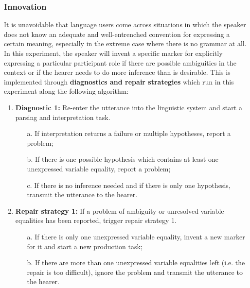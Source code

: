 \subsubsection{Innovation}
 It is unavoidable that language users come across situations in which the speaker does not know an adequate and well-entrenched convention for expressing a certain meaning, especially in the extreme case where there is no grammar at all. In this experiment, the speaker will invent a specific marker for explicitly expressing a particular participant role if there are possible ambiguities in the context or if the hearer needs to do more inference than is desirable. This is implemented through {\bfseries diagnostics and repair strategies} which run in this experiment along the following algorithm:

\begin{enumerate}
\item {\bfseries Diagnostic 1:} Re-enter the utterance into the linguistic system and start a parsing and interpretation task.
\begin{enumerate}
\item[a.] If interpretation returns a failure or multiple hypotheses, report a problem;
\item[b.] If there is one possible hypothesis which contains at least one unexpressed variable equality, report a problem;
\item[c.] If there is no inference needed and if there is only one hypothesis, transmit the utterance to the hearer.
\end{enumerate}
\item {\bfseries Repair strategy 1:} If a problem of ambiguity or unresolved variable equalities has been reported, trigger repair strategy 1.
\begin{enumerate}
\item[a.] If there is only one unexpressed variable equality, invent a new marker for it and start a new production task;
\item[b.] If there are more than one unexpressed variable equalities left (i.e. the repair is too difficult), ignore the problem and transmit the utterance to the hearer.
\end{enumerate}
\end{enumerate}

